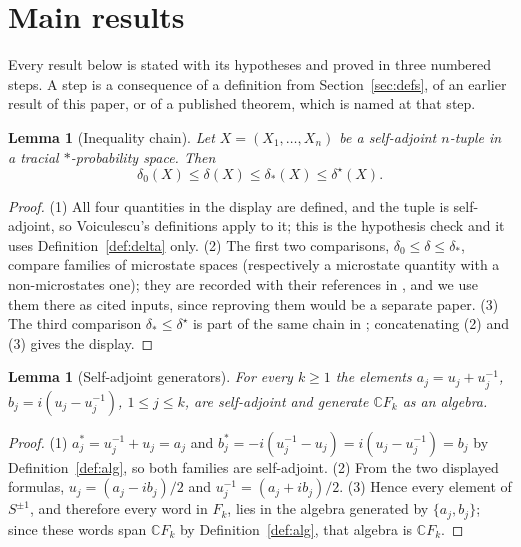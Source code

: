 \documentclass[11pt]{article}
\theoremstyle{plain}
\newtheorem{lemma}[theorem]{Lemma}
\theoremstyle{definition}
\theoremstyle{remark}
\newcommand{\C}{\mathbb{C}}\newcommand{\N}{\mathbb{N}}
\begin{document}
\section{Main results}\label{sec:main}

Every result below is stated with its hypotheses and proved in three numbered steps. A step is a consequence of a definition from Section~\ref{sec:defs}, of an earlier result of this paper, or of a published theorem, which is named at that step.

\begin{lemma}[Inequality chain]\label{lem:chain}
Let $X=(X_1,\dots,X_n)$ be a self-adjoint $n$-tuple in a tracial $*$-probability space. Then
\[
\delta_0(X)\le\delta(X)\le\delta_*(X)\le\delta^\star(X).
\]
\end{lemma}

\begin{proof}
(1) All four quantities in the display are defined, and the tuple is self-adjoint, so Voiculescu's definitions \cite{Voi94} apply to it; this is the hypothesis check and it uses Definition~\ref{def:delta} only.
(2) The first two comparisons, $\delta_0\le\delta\le\delta_*$, compare families of microstate spaces (respectively a microstate quantity with a non-microstates one); they are recorded with their references in \cite[Lemma 6]{Sh06}, and we use them there as cited inputs, since reproving them would be a separate paper.
(3) The third comparison $\delta_*\le\delta^\star$ is part of the same chain in \cite[Lemma 6]{Sh06}; concatenating (2) and (3) gives the display.
\end{proof}

\begin{lemma}[Self-adjoint generators]\label{lem:sa}
For every $k\ge1$ the elements $a_j=u_j+u_j^{-1}$, $b_j=i(u_j-u_j^{-1})$, $1\le j\le k$, are self-adjoint and generate $\C F_k$ as an algebra.
\end{lemma}

\begin{proof}
(1) $a_j^*=u_j^{-1}+u_j=a_j$ and $b_j^*=-i(u_j^{-1}-u_j)=i(u_j-u_j^{-1})=b_j$ by Definition~\ref{def:alg}, so both families are self-adjoint.
(2) From the two displayed formulas, $u_j=(a_j-ib_j)/2$ and $u_j^{-1}=(a_j+ib_j)/2$.
(3) Hence every element of $S^{\pm1}$, and therefore every word in $F_k$, lies in the algebra generated by $\{a_j,b_j\}$; since these words span $\C F_k$ by Definition~\ref{def:alg}, that algebra is $\C F_k$.
\end{proof}
\end{document}

